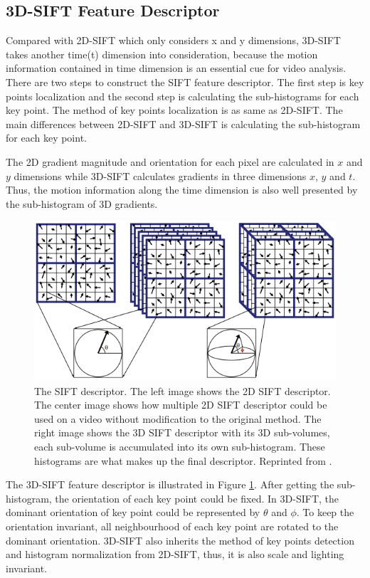 \subsection{3D-SIFT Feature Descriptor}
\label{2_2_1}
Compared with 2D-SIFT\cite{lowe1999}\cite{lowe2004} which only considers x and y dimensions, 3D-SIFT\cite{grepory2010}\cite{paul2007} takes another time(t) dimension into consideration, because the motion information contained in time dimension is an essential cue for video analysis. There are two steps to construct the SIFT feature descriptor. The first step is key points localization and the second step is calculating the sub-histograms for each key point. The method of key points localization is as same as 2D-SIFT. The main differences between 2D-SIFT and 3D-SIFT is calculating the sub-histogram for each key point.
\par 
The 2D gradient magnitude and orientation for each pixel are calculated in \(x\) and \(y\) dimensions while 3D-SIFT calculates gradients in three dimensions \(x\), \(y\) and \(t\). Thus, the motion information along the time dimension is also well presented by the sub-histogram of 3D gradients.  
\begin{figure}
	\includegraphics[width=\linewidth]{figs/3D_SIFT.png}
	\caption{The SIFT descriptor. The left image shows the 2D SIFT descriptor. The center image shows how multiple 2D SIFT descriptor could be used on a video without modification to the original method. The right image shows the 3D SIFT descriptor with its 3D sub-volumes, each sub-volume is accumulated into its own sub-histogram. These histograms are what makes up the final descriptor. Reprinted from \cite{grepory2010}.}
	\label{fig:3DSIFT}
\end{figure}
\par 
The 3D-SIFT feature descriptor is illustrated in Figure \ref{fig:3DSIFT}. After getting the sub-histogram, the orientation of each key point could be fixed. In 3D-SIFT, the dominant orientation of key point could be represented by\(\) \(\theta\) and \(\phi\). To keep the orientation invariant, all neighbourhood of each key point are rotated to the dominant orientation. 3D-SIFT also inherits the method of key points detection and histogram normalization from 2D-SIFT, thus, it is also scale and lighting invariant. 


